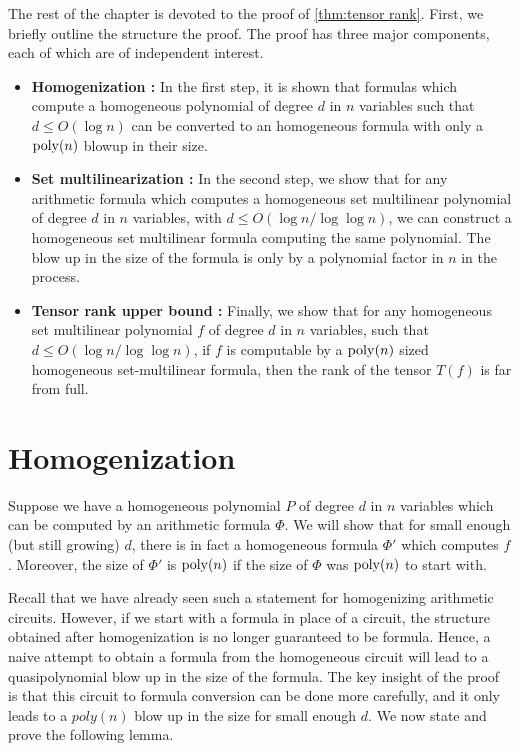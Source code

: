 The rest of the chapter is devoted to the proof of \autoref{thm:tensor rank}. First, we briefly outline the structure the proof. The proof has three major components, each of which are of independent interest. 
\begin{itemize}
\item {\bf Homogenization :} In the first step, it is shown that formulas which compute a homogeneous polynomial of degree $d$ in $n$ variables such that $d \leq O(\log n)$ can be converted to an homogeneous formula with only a $\operatorname{poly}(n)$ blowup in their size. 
\item {\bf Set multilinearization :} In the second step, we show that for any arithmetic formula which computes a homogeneous  set multilinear  polynomial of degree $d$ in $n$ variables, with $d \leq O(\log n/\log \log n)$, we can construct a homogeneous set multilinear formula computing the same polynomial. The blow up in the size of the formula is only by a polynomial factor in $n$ in the process. 
\item {\bf Tensor rank upper bound :} Finally, we  show that for any homogeneous set multilinear polynomial $f$ of degree $d$ in $n$ variables, such that $d \leq O(\log n/\log \log n) $, if $f$ is computable by a $\operatorname{poly}(n)$ sized homogeneous set-multilinear formula, then the rank of the tensor $T(f)$ is far from full. 
\end{itemize}


\section{Homogenization}\label{sec:homogenization}

Suppose we have a homogeneous polynomial $P$ of degree $d$ in $n$ variables which can be computed by an arithmetic formula $\Phi$. 
We will show that for small  enough (but still growing) $d$, there is in fact a homogeneous formula $\Phi'$ which computes $f$. Moreover, the size of $\Phi'$ is $\operatorname{poly}(n)$ if the size of $\Phi$ was $\operatorname{poly}(n)$ to start with. 

Recall that we have already seen such a statement for homogenizing  arithmetic circuits. However, if we start with a formula in place of a circuit, the structure obtained after homogenization is no longer guaranteed to be formula. Hence, a naive attempt to obtain a formula from the homogeneous circuit will lead to a quasipolynomial blow up in the size of the formula. The key insight of the proof  is that this circuit to formula conversion can be done more carefully, and it only leads to a $poly(n)$ blow up in the size for small enough $d$. We now state and prove the following lemma. 

